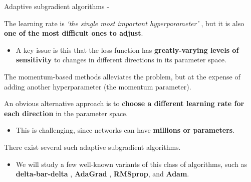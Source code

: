 

\begin{frame}[t,allowframebreaks]{
    Adaptive subgradient algorithms -}

    The \gls{learning rate}
    is {\em `the single most important 
    \gls{hyperparameter}'} \cite{Bengio:2012gbt},
    but it is also {\bf one of the most difficult ones to adjust}.\\
    \begin{itemize}
        \small
        \item
        A key issue is this that
        the \gls{loss function} has 
        {\bf greatly-varying levels of sensitivity} to changes 
        in different directions in its parameter space.\\
    \end{itemize}

    \vspace{0.2cm}

    The \gls{momentum}-based methods
    alleviates the problem, 
    but at the expense of adding another \gls{hyperparameter}
    (the \gls{momentum parameter}).

    \vspace{0.2cm}

    An obvious alternative approach is to {\bf choose a different 
    \gls{learning rate} for each direction} in the parameter space.\\
    \begin{itemize}
        \small
        \item This is challenging, since networks 
        can have {\bf millions or parameters}.
    \end{itemize}

    \vspace{0.2cm}

    There exist several such 
    \gls{adaptive subgradient} algorithms.\\
    \begin{itemize}
        \small
        \item 
        We will study a few well-known variants of this 
        class of algorithms, such as 
        {\bf delta-bar-delta} \cite{Jacobs:1988dbd},
        {\bf AdaGrad} \cite{Duchi:11a},
        {\bf RMSprop}, and
        {\bf Adam}.
    \end{itemize}

\end{frame}

